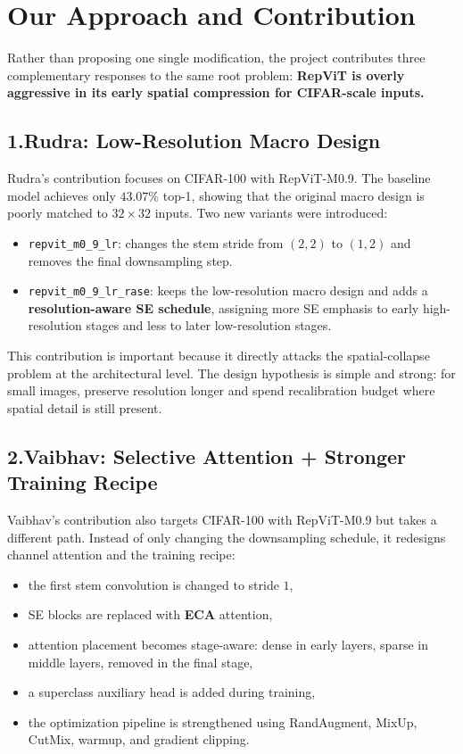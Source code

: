 \documentclass[10pt,a4paper,twocolumn]{article}
\begin{document}
\section{Our Approach and Contribution}

Rather than proposing one single modification, the project contributes three complementary responses to the same root problem: \textbf{RepViT is overly aggressive in its early spatial compression for CIFAR-scale inputs.}

\subsection*{1.Rudra: Low-Resolution Macro Design}

Rudra's contribution focuses on CIFAR-100 with RepViT-M0.9. The baseline model achieves only \(43.07\%\) top-1, showing that the original macro design is poorly matched to \(32\times32\) inputs. Two new variants were introduced:
\begin{itemize}[leftmargin=1.2em]
    \item \texttt{repvit\_m0\_9\_lr}: changes the stem stride from \((2,2)\) to \((1,2)\) and removes the final downsampling step.
    \item \texttt{repvit\_m0\_9\_lr\_rase}: keeps the low-resolution macro design and adds a \textbf{resolution-aware SE schedule}, assigning more SE emphasis to early high-resolution stages and less to later low-resolution stages.
\end{itemize}

This contribution is important because it directly attacks the spatial-collapse problem at the architectural level. The design hypothesis is simple and strong: for small images, preserve resolution longer and spend recalibration budget where spatial detail is still present.

\subsection*{2.Vaibhav: Selective Attention + Stronger Training Recipe}

Vaibhav's contribution also targets CIFAR-100 with RepViT-M0.9 but takes a different path. Instead of only changing the downsampling schedule, it redesigns channel attention and the training recipe:
\begin{itemize}[leftmargin=1.2em]
    \item the first stem convolution is changed to stride \(1\),
    \item SE blocks are replaced with \textbf{ECA} attention,
    \item attention placement becomes stage-aware: dense in early layers, sparse in middle layers, removed in the final stage,
    \item a superclass auxiliary head is added during training,
    \item the optimization pipeline is strengthened using RandAugment, MixUp, CutMix, warmup, and gradient clipping.
\end{itemize}
\end{document}

